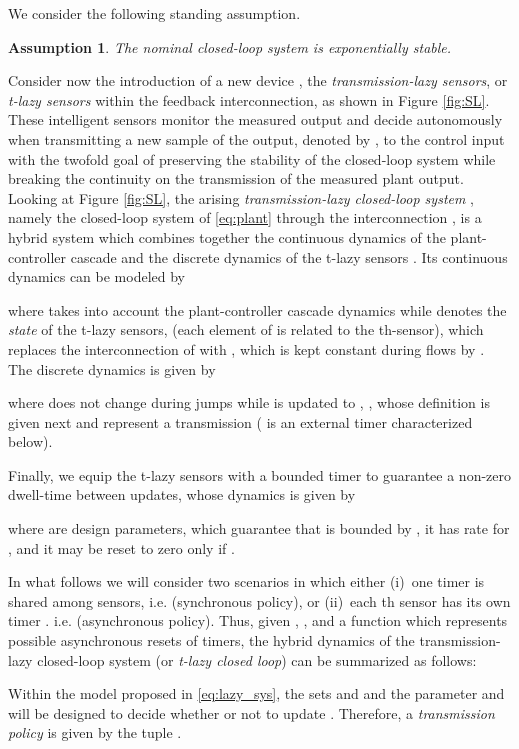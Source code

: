 \documentclass[twocolumn]{autart}
\newtheorem{assumption}{Assumption}
\begin{document}
We consider the following standing assumption.
\begin{assumption} 
\label{assume:well-posed}
 The nominal closed-loop system  
is exponentially stable.
\end{assumption}
Consider now the introduction of a new device , 
the \emph{transmission-lazy sensors}, or {\em t-lazy sensors} within the feedback interconnection, 
as shown in Figure \ref{fig:SL}. These intelligent sensors
monitor the measured output  and decide autonomously
when transmitting a new sample of the output, denoted by ,  
to the control input  
with the twofold goal of preserving the stability of the
closed-loop system while breaking the continuity on the transmission
of the measured plant output.
Looking at Figure \ref{fig:SL}, the arising \emph{transmission-lazy closed-loop system} ,
namely the closed-loop system of \eqref{eq:plant} through the 
interconnection , is a hybrid system which
combines together the
continuous dynamics of the plant-controller cascade 
 and the discrete dynamics of 
the t-lazy sensors . Its continuous dynamics can be modeled by 

where  takes into account the plant-controller 
cascade dynamics while  denotes the \emph{state} of the
t-lazy sensors, (each element  of  is 
related to the th-sensor), which replaces 
the interconnection  of  with , 
which is kept constant during flows by . The discrete dynamics is given by

where  does not change during jumps 
while  is updated to , 
,
whose definition is given next and represent a transmission 
( is an external timer characterized below). 

Finally, we equip the t-lazy sensors with a bounded timer to guarantee 
a non-zero dwell-time between updates, whose dynamics is given by

where  are design parameters, 
which guarantee 
that  is bounded by , it has
rate  for , and it
may be reset to zero only if .

In what follows we will consider two scenarios in which 
either (i)~one timer  is shared among sensors, 
i.e.  (synchronous policy), or 
(ii)~each th sensor has its own timer .
i.e.  (asynchronous policy). Thus, given 
, 
,
and a function 
which represents possible asynchronous resets of timers, 
the hybrid dynamics of the transmission-lazy closed-loop system
(or {\em t-lazy closed loop}) can be summarized as follows: 

Within the model proposed in \eqref{eq:lazy_sys},
the sets  and  
and the parameter  and 
will be designed to decide whether or not to update . Therefore,
a \emph{transmission policy} is given by the tuple
.
\end{document}
